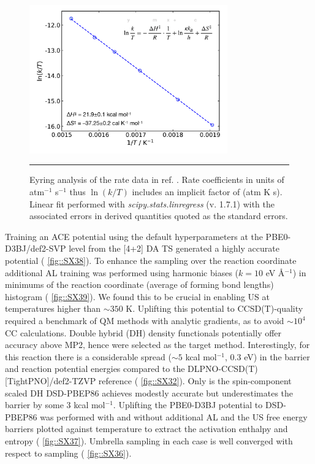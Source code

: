 \documentclass[11pt]{article}
\numberwithin{equation}{subsection}
\newcommand{\kcal}{kcal mol$^{-1}$}
\begin{document}
\begin{figure}[h!]
	\centering
	\vspace{0.4cm}
	\includegraphics[height=6.4cm]{figSX35.pdf}
	\vspace{0.1cm}
	\hrule
	\vspace{0.1cm}
	\caption{Eyring analysis of the rate data in ref. \cite{Walsh1975}. Rate coefficients in units of atm$^{-1}$ s$^{-1}$ thus $\ln(k/T)$ includes an implicit factor of (atm K s). Linear fit performed with \emph{scipy.stats.linregress} (v. 1.7.1) with the associated errors in derived quantities quoted as the standard errors.}
	\label{fig::SX35}
\end{figure}


Training an ACE potential using the default hyperparameters at the PBE0-D3BJ/def2-SVP level from the [4+2] DA TS generated a highly accurate potential (\figurename{ \ref{fig::SX38}}). To enhance the sampling over the reaction coordinate additional AL training was performed using harmonic biases ($k = 10$ eV \AA${}^{-1}$) in minimums of the reaction coordinate (average of forming bond lengths)  histogram (\figurename{ \ref{fig::SX39}}). We found this to be crucial in enabling US at temperatures higher than $\sim 350$ K. Uplifting this potential to CCSD(T)-quality required a benchmark of QM methods with analytic gradients, as to avoid $\sim10^4$ CC calculations. Double hybrid (DH) density functionals potentially offer accuracy above MP2, hence were selected as the target method. Interestingly, for this reaction there is a considerable spread ($\sim5$ \kcal, 0.3 eV) in the barrier and reaction potential energies compared to the DLPNO-CCSD(T)[TightPNO]/def2-TZVP reference (\figurename{ \ref{fig::SX32}}). Only is the spin-component scaled DH DSD-PBEP86 achieves modestly accurate but underestimates the barrier by some 3 \kcal. Uplifting the PBE0-D3BJ potential to  DSD-PBEP86 was performed with and without additional AL and the US free energy barriers plotted against temperature to extract the activation enthalpy and entropy (\figurename{ \ref{fig::SX37}}). Umbrella sampling in each case is well converged with respect to sampling (\figurename{ \ref{fig::SX36}}).
\end{document}
